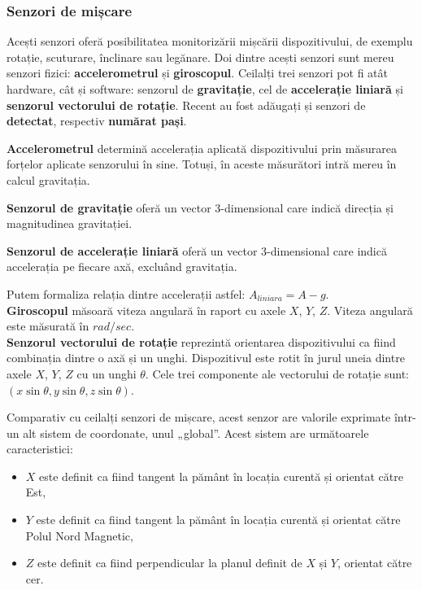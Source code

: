 \documentclass[12pt, a4paper, oneside]{article}
\begin{document}
\subsubsection{Senzori de mișcare}
Acești senzori oferă posibilitatea monitorizării mișcării dispozitivului, de exemplu rotație, scuturare, înclinare sau legănare. Doi dintre acești senzori sunt mereu senzori fizici: \textbf{accelerometrul} și \textbf{giroscopul}. Ceilalți trei senzori pot fi atât hardware, cât și software: senzorul de \textbf{gravitație}, cel de \textbf{accelerație liniară} și \textbf{senzorul vectorului de rotație}. Recent au fost adăugați și senzori de \textbf{detectat}, respectiv \textbf{numărat pași}.

	\textbf{Accelerometrul} determină accelerația aplicată dispozitivului prin măsurarea forțelor aplicate senzorului în sine. Totuși, în aceste măsurători intră mereu în calcul gravitația.

	\textbf{Senzorul de gravitație} oferă un vector 3-dimensional care indică direcția și magnitudinea gravitației.

	\textbf{Senzorul de accelerație liniară} oferă un vector 3-dimensional care indică accelerația pe fiecare axă, excluând gravitația.

	Putem formaliza relația dintre accelerații astfel:
	$A_{liniara} = A - g$.\\

	\textbf{Giroscopul} măsoară viteza angulară în raport cu axele $X$, $Y$, $Z$. Viteza angulară este măsurată în $rad/sec$.\\

	\textbf{Senzorul vectorului de rotație} reprezintă orientarea dispozitivului ca fiind combinația dintre o axă și un unghi. Dispozitivul este rotit în jurul uneia dintre axele $X$, $Y$, $Z$ cu un unghi $\theta$. Cele trei componente ale vectorului de rotație sunt: $(x \sin{\theta}, y \sin{\theta}, z \sin{\theta})$. 
	
	Comparativ cu ceilalți senzori de mișcare, acest senzor are valorile exprimate într-un alt sistem de coordonate, unul „global”.
	Acest sistem are următoarele caracteristici:
	\begin{itemize}
	\item $X$ este definit ca fiind tangent la pământ în locația curentă și orientat către Est,
	\item $Y$ este definit ca fiind tangent la pământ în locația curentă și orientat către Polul Nord Magnetic,
	\item $Z$ este definit ca fiind perpendicular la planul definit de $X$ și $Y$, orientat către cer.
	\end{itemize}
	
\end{document}
